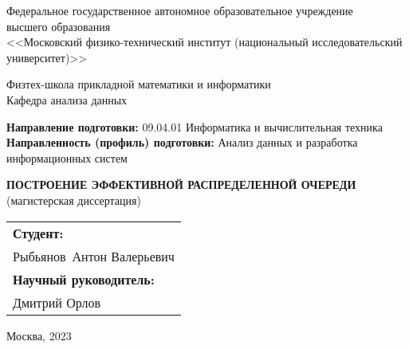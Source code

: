 \thispagestyle{empty}
\begin{center}
  Федеральное государственное автономное образовательное учреждение \\
  высшего образования \\
  <<Московский физико-технический институт (национальный исследовательский университет)>>

  \smallskip
  {\small
    Физтех-школа прикладной математики и информатики \\
    Кафедра анализа данных
  }
\end{center}

\bigskip
{
  \small\noindent
  \textbf{Направление подготовки:} 09.04.01 Информатика и вычислительная техника \\
  \textbf{Направленность (профиль) подготовки:} Анализ данных и разработка информационных систем
}

\vspace{0pt plus 8fill}

\begin{center}
  \textbf{
    \MakeUppercase{Построение эффективной распределенной очереди}\\
  }
  (магистерская диссертация)

  \vspace{0pt plus 3fill}

  \begin{flushright}
    \begin{tabular}{l}
      \textbf{Студент:}              \\
      Рыбьянов~Антон Валерьевич      \\[7ex]

      \textbf{Научный руководитель:} \\
      Дмитрий Орлов
    \end{tabular}
  \end{flushright}

  \vspace{0pt plus 4fill}
  {Москва, 2023}
\end{center}



